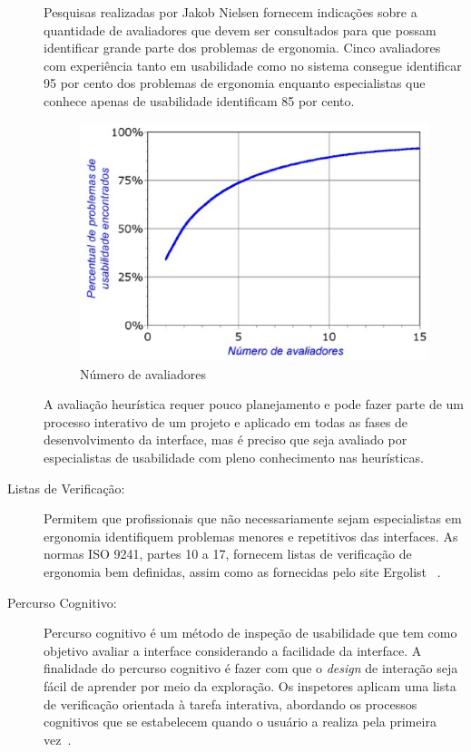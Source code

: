 \begin{description}
	Pesquisas realizadas por Jakob Nielsen fornecem indicações sobre a quantidade de avaliadores que devem ser consultados para que possam identificar grande parte dos problemas de ergonomia. Cinco avaliadores com experiência tanto em usabilidade como no sistema consegue identificar 95 por cento dos problemas de ergonomia enquanto especialistas que conhece apenas de usabilidade identificam 85 por cento.

\begin{figure}[h]
    \centering
    \includegraphics[keepaspectratio=true,scale=0.60]
      {figuras/avaliadores_heuristica.eps}
    \caption{Número de avaliadores~\cite{nielsen1994}}
    \label{avaliadores}
\end{figure}

	A avaliação heurística requer pouco planejamento e pode fazer parte de um processo interativo de um projeto e aplicado em todas as fases de desenvolvimento da interface, mas é preciso que seja avaliado por especialistas de usabilidade com pleno conhecimento nas heurísticas.
	

\item[Listas de Verificação:]

	Permitem que profissionais que não necessariamente sejam especialistas em ergonomia identifiquem problemas menores e repetitivos das interfaces. As normas ISO 9241, partes 10 a 17, fornecem listas de verificação de ergonomia bem definidas, assim como as fornecidas pelo site Ergolist ~\cite{cybis2010}.
	

\item[Percurso Cognitivo:]

Percurso cognitivo é um método de inspeção de usabilidade que tem como objetivo avaliar a interface considerando a facilidade da interface. A finalidade do percurso cognitivo é fazer com que o \emph{design} de interação seja fácil de aprender por meio da exploração. Os inspetores aplicam uma lista de verificação orientada à tarefa interativa, abordando os processos cognitivos que se estabelecem quando o usuário a realiza pela primeira vez~\cite{cybis2010}.



\end{description}
